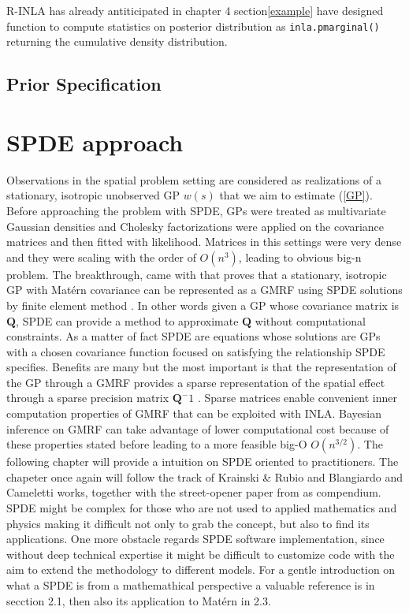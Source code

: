 \documentclass[
  12pt,
  a4paper,
  oneside]{book}
\newcommand{\passthrough}[1]{#1}
\theoremstyle{definition}
\theoremstyle{definition}
\theoremstyle{definition}
\theoremstyle{remark}
\begin{document}
R-INLA has already antiticipated in chapter 4 section\ref{example} have designed function to compute statistics on posterior distribution as \passthrough{\lstinline!inla.pmarginal()!} returning the cumulative density distribution.

\hypertarget{prior-specification}{%
\section{Prior Specification}\label{prior-specification}}

\hypertarget{spde}{%
\chapter{SPDE approach}\label{spde}}

Observations in the spatial problem setting are considered as realizations of a stationary, isotropic unobserved GP \(w(s)\) that we aim to estimate (\ref{GP}). Before approaching the problem with SPDE, GPs were treated as multivariate Gaussian densities and Cholesky factorizations were applied on the covariance matrices and then fitted with likelihood. Matrices in this settings were very dense and they were scaling with the order of \(O\left(n^{3}\right)\), leading to obvious big-n problem.
The breakthrough, came with \citet{Lindgren2011} that proves that a stationary, isotropic GP with Matérn covariance can be represented as a GMRF using SPDE solutions by finite element method \citep{Krainski-Rubio}. In other words given a GP whose covariance matrix is \(\boldsymbol{Q}\), SPDE can provide a method to approximate \(\boldsymbol{Q}\) without computational constraints. As a matter of fact SPDE are equations whose solutions are GPs with a chosen covariance function focused on satisfying the relationship SPDE specifies.
Benefits are many but the most important is that the representation of the GP through a GMRF provides a sparse representation of the spatial effect through a sparse precision matrix \(\boldsymbol{Q}^-1\) . Sparse matrices enable convenient inner computation properties of GMRF that can be exploited with INLA. Bayesian inference on GMRF can take advantage of lower computational cost because of these properties stated before leading to a more feasible big-O \(O\left(n^{3 / 2}\right)\). The following chapter will provide a intuition on SPDE oriented to practitioners. The chapeter once again will follow the track of Krainski \& Rubio \citeyearpar{Krainski-Rubio} and Blangiardo and Cameletti \citeyearpar{Blangiardo-Cameletti} works, together with the street-opener paper from \citet{Miller2019} as compendium. SPDE might be complex for those who are not used to applied mathematics and physics making it difficult not only to grab the concept, but also to find its applications. One more obstacle regards SPDE software implementation, since without deep technical expertise it might be difficult to customize code with the aim to extend the methodology to different models. For a gentle introduction on what a SPDE is from a mathemathical perspective a valuable reference is \citet{Miller2019} in secction 2.1, then also its application to Matérn in 2.3.
\end{document}
